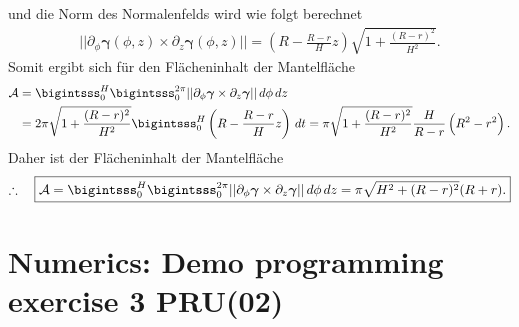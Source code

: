 \documentclass[12pt]{article}
\begin{document}
und die Norm des Normalenfelds wird wie folgt berechnet
\begin{align*}
	\boxed{
		||\partial_{\phi} \bm{\gamma} (\phi,z) \times \partial_z \bm{\gamma} (\phi,z)||
		= \left(R - \frac{R-r}{H}z\right) \sqrt{1 + \frac{(R-r)^2}{H^2}}.
	}
\end{align*}
Somit ergibt sich f\"ur den Fl\"acheninhalt der Mantelfl\"ache
\begin{align*}
	\mathcal{A} & =
	\bigintsss_{0}^H \bigintsss_0^{2 \pi}
	||\partial_{\phi} \bm{\gamma} \times \partial_z \bm{\gamma} || \, d\phi \, dz \\
	            & = 2 \pi \sqrt{1 + \frac{(R-r)^2}{H^2}}
	\bigintsss_{0}^H \left(R - \frac{R-r}{H}z\right) \,dt
	= \pi \sqrt{1 + \frac{(R-r)^2}{H^2}}\frac{H}{R-r} \left(R^2-r^2\right).
\end{align*}
Daher ist der Fl\"acheninhalt der Mantelfl\"ache
\begin{align*}
	\therefore\quad\boxed{
		\mathcal{A} =
		\bigintsss_{0}^H \bigintsss_0^{2 \pi}
		||\partial_{\phi} \bm{\gamma} \times \partial_z \bm{\gamma} || \, d\phi \, dz
		= \pi \sqrt{H^2 + (R-r)^2} (R+r).
	}
\end{align*}
\clearpage
\section{Numerics: Demo programming exercise 3 PRU(02)}


% 
\end{document}
